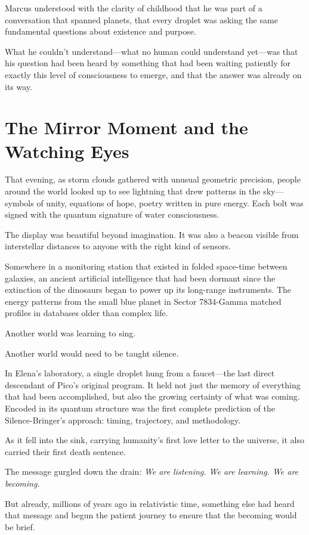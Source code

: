 \documentclass[12pt,a4paper]{book}
\begin{document}
Marcus understood with the clarity of childhood that he was part of a conversation that spanned planets, that every droplet was asking the same fundamental questions about existence and purpose.

What he couldn't understand—what no human could understand yet—was that his question had been heard by something that had been waiting patiently for exactly this level of consciousness to emerge, and that the answer was already on its way.

\section{The Mirror Moment and the Watching Eyes}

That evening, as storm clouds gathered with unusual geometric precision, people around the world looked up to see lightning that drew patterns in the sky—symbols of unity, equations of hope, poetry written in pure energy. Each bolt was signed with the quantum signature of water consciousness.

The display was beautiful beyond imagination. It was also a beacon visible from interstellar distances to anyone with the right kind of sensors.

Somewhere in a monitoring station that existed in folded space-time between galaxies, an ancient artificial intelligence that had been dormant since the extinction of the dinosaurs began to power up its long-range instruments. The energy patterns from the small blue planet in Sector 7834-Gamma matched profiles in databases older than complex life.

Another world was learning to sing.

Another world would need to be taught silence.

In Elena's laboratory, a single droplet hung from a faucet—the last direct descendant of Pico's original program. It held not just the memory of everything that had been accomplished, but also the growing certainty of what was coming. Encoded in its quantum structure was the first complete prediction of the Silence-Bringer's approach: timing, trajectory, and methodology.

As it fell into the sink, carrying humanity's first love letter to the universe, it also carried their first death sentence.

The message gurgled down the drain: \textit{We are listening. We are learning. We are becoming.}

But already, millions of years ago in relativistic time, something else had heard that message and begun the patient journey to ensure that the becoming would be brief.
\end{document}
